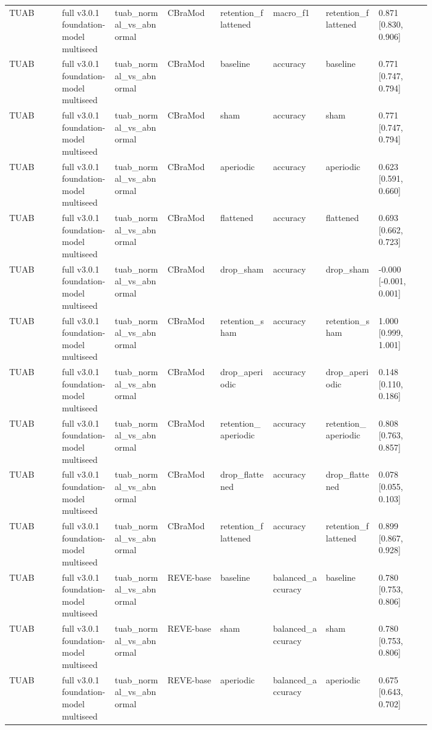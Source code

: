 \begin{longtable}{p{0.10\linewidth}p{0.10\linewidth}p{0.10\linewidth}p{0.10\linewidth}p{0.10\linewidth}p{0.10\linewidth}p{0.10\linewidth}p{0.10\linewidth}}
TUAB & full v3.0.1 foundation-model multiseed & tuab\_normal\_vs\_abnormal & CBraMod & retention\_flattened & macro\_f1 & retention\_flattened & 0.871 [0.830, 0.906]\\
TUAB & full v3.0.1 foundation-model multiseed & tuab\_normal\_vs\_abnormal & CBraMod & baseline & accuracy & baseline & 0.771 [0.747, 0.794]\\
TUAB & full v3.0.1 foundation-model multiseed & tuab\_normal\_vs\_abnormal & CBraMod & sham & accuracy & sham & 0.771 [0.747, 0.794]\\
TUAB & full v3.0.1 foundation-model multiseed & tuab\_normal\_vs\_abnormal & CBraMod & aperiodic & accuracy & aperiodic & 0.623 [0.591, 0.660]\\
TUAB & full v3.0.1 foundation-model multiseed & tuab\_normal\_vs\_abnormal & CBraMod & flattened & accuracy & flattened & 0.693 [0.662, 0.723]\\
TUAB & full v3.0.1 foundation-model multiseed & tuab\_normal\_vs\_abnormal & CBraMod & drop\_sham & accuracy & drop\_sham & -0.000 [-0.001, 0.001]\\
TUAB & full v3.0.1 foundation-model multiseed & tuab\_normal\_vs\_abnormal & CBraMod & retention\_sham & accuracy & retention\_sham & 1.000 [0.999, 1.001]\\
TUAB & full v3.0.1 foundation-model multiseed & tuab\_normal\_vs\_abnormal & CBraMod & drop\_aperiodic & accuracy & drop\_aperiodic & 0.148 [0.110, 0.186]\\
TUAB & full v3.0.1 foundation-model multiseed & tuab\_normal\_vs\_abnormal & CBraMod & retention\_aperiodic & accuracy & retention\_aperiodic & 0.808 [0.763, 0.857]\\
TUAB & full v3.0.1 foundation-model multiseed & tuab\_normal\_vs\_abnormal & CBraMod & drop\_flattened & accuracy & drop\_flattened & 0.078 [0.055, 0.103]\\
TUAB & full v3.0.1 foundation-model multiseed & tuab\_normal\_vs\_abnormal & CBraMod & retention\_flattened & accuracy & retention\_flattened & 0.899 [0.867, 0.928]\\
TUAB & full v3.0.1 foundation-model multiseed & tuab\_normal\_vs\_abnormal & REVE-base & baseline & balanced\_accuracy & baseline & 0.780 [0.753, 0.806]\\
TUAB & full v3.0.1 foundation-model multiseed & tuab\_normal\_vs\_abnormal & REVE-base & sham & balanced\_accuracy & sham & 0.780 [0.753, 0.806]\\
TUAB & full v3.0.1 foundation-model multiseed & tuab\_normal\_vs\_abnormal & REVE-base & aperiodic & balanced\_accuracy & aperiodic & 0.675 [0.643, 0.702]\\

\end{longtable}
